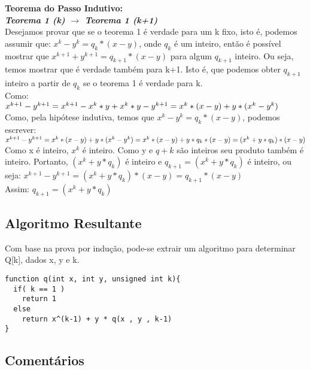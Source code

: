 \documentclass[twoside]{article}
\begin{document}
\begin{multicols}{2}
\textbf{Teorema do Passo Indutivo:}\\

\textit{\textbf{Teorema 1 (k) $\rightarrow$ Teorema 1 (k+1)}}\\
Desejamos provar que se o teorema 1 é verdade para um k fixo, isto é, podemos assumir que: $x^k-y^k=q_k*(x-y)$, onde $q_k$ é um inteiro, então é possível mostrar que $x^{k+1}+y^{k+1}=q_{k+1}*(x-y)$ para algum $q_{k+1}$ inteiro. Ou seja, temos mostrar que é verdade também para k+1. Isto é, que podemos obter $q_{k+1}$ inteiro a partir de $q_k$ se o teorema 1 é verdade para k.\\

Como:\\
$x^{k+1}-y^{k+1} =\\ x^{k+1}-x^k*y + x^k*y - y^{k+1} =\\ x^k*(x-y)+y*(x^k-y^k)$\\

Como, pela hipótese indutiva, temos que $x^k-y^k = q_k * (x-y)$, podemos escrever:\\
$x^{k+1}-y^{k+1} =\\ x^k*(x-y)+y*(x^k-y^k) =\\ x^k*(x-y) + y * q_k * (x-y) =\\ (x^k+y*q_k)*(x-y)$\\

Como x é inteiro, $x^k$ é inteiro. Como y e $q+ k$ são inteiros seu produto também é inteiro. Portanto, $(x^k + y*q_k)$ é inteiro e $q_{k+1} = (x^k+y*q_k)$ é inteiro, ou seja: $x^{k+1}-y^{k+1} = (x^k+y*q_k)*(x-y) = q_{k+1}*(x-y)$\\

Assim: $q_{k+1}= (x^k+y*q_k)$\\

\subsection{ Algoritmo Resultante }
\indent Com base na prova por indução, pode-se extrair um algoritmo para determinar Q[k], dados x, y e k.

\begin{lstlisting}
function q(int x, int y, unsigned int k){
  if( k == 1 )
    return 1
  else
    return x^(k-1) + y * q(x , y , k-1)  
}
\end{lstlisting}

\subsection{ Comentários }


\end{multicols}
\end{document}
